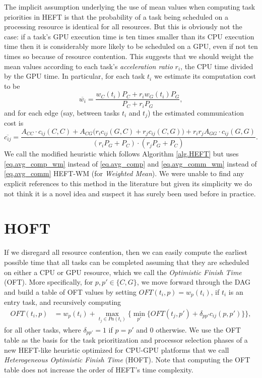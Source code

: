 \documentclass[runningheads]{llncs}
\begin{document}
The implicit assumption underlying the use of mean values when computing task priorities in HEFT is that the probability of a task being scheduled on a processing resource is identical for all resources. But this is obviously not the case: if a task's GPU execution time is ten times smaller than its CPU execution time then it is considerably more likely to be scheduled on a GPU, even if not ten times so because of resource contention. This suggests that we should weight the mean values according to each task's {\em acceleration ratio} $r_i$, the CPU time divided by the GPU time. In particular, for each task $t_i$ we estimate its computation cost to be
\begin{equation}
\label{eq.avg_comp_wm}
\overline{w_i} = \frac{w_C(t_i) P_C + r_iw_G(t_i) P_G}{P_C + r_iP_G},
\end{equation}  
and for each edge (say, between tasks $t_i$ and $t_j$) the estimated communication cost is
\begin{equation}
\label{eq.avg_comm_wm}
\overline{c_{ij}} = \frac{A_{CC} \cdot c_{ij}(C, C) + A_{CG}\big(r_ic_{ij}(G, C) + r_jc_{ij}(C, G)\big) + r_ir_j A_{GG} \cdot c_{ij}(G, G) }{(r_iP_G + P_C) \cdot (r_jP_G + P_C)}. 
\end{equation}
We call the modified heuristic which follows Algorithm \ref{alg.HEFT} but uses \eqref{eq.avg_comp_wm} instead of \eqref{eq.avg_comp} and \eqref{eq.avg_comm_wm} instead of \eqref{eq.avg_comm} HEFT-WM (for {\em Weighted Mean}). We were unable to find any explicit references to this method in the literature but given its simplicity we do not think it is a novel idea and suspect it has surely been used before in practice.  


\section{HOFT}
\label{sect.hoft}

If we disregard all resource contention, then we can easily compute the earliest possible time that all tasks can be completed assuming that they are scheduled on either a CPU or GPU resource, which we call the {\em Optimistic Finish Time} (OFT). More specifically, for $p, p' \in \{C, G\}$, we move forward through the DAG and build a table of OFT values by setting $OFT(t_i, p) = w_p(t_i)$, if $t_i$ is an entry task, and recursively computing     
\begin{align}
\label{eq.oft_table}
OFT(t_i, p) &= w_p(t_i) + \max_{t_j \in Pa(t_i)} \bigg \{ \min_{p'} \{ OFT(t_j, p') + \delta_{pp'} c_{ij} (p, p') \}  \bigg \}, 
\end{align}
for all other tasks, where $\delta_{pp'} = 1$ if $p = p'$ and $0$ otherwise. We use the OFT table as the basis for the task prioritization and processor selection phases of a new HEFT-like heuristic optimized for CPU-GPU platforms that we call {\em Heterogeneous Optimistic Finish Time} (HOFT). Note that computing the OFT table does not increase the order of HEFT's time complexity.  
\end{document}
